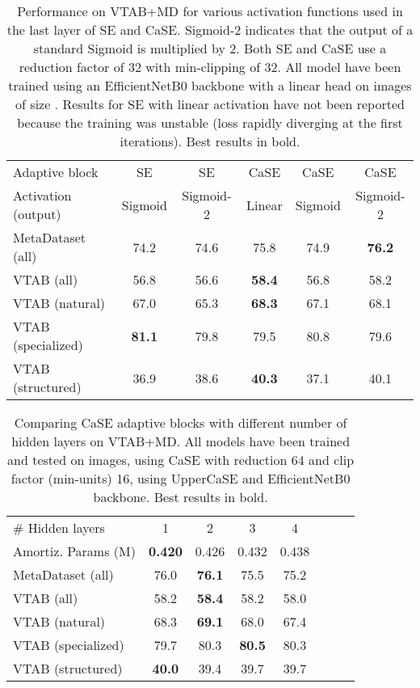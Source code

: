 \documentclass{article}
\begin{document}
\begin{table}[H]
\caption{Performance on VTAB+MD for various activation functions used in the last layer of SE and CaSE. Sigmoid-2 indicates that the output of a standard Sigmoid is multiplied by 2. Both SE and CaSE use a reduction factor of 32 with min-clipping of 32. All model have been trained using an EfficientNetB0 backbone with a linear head on images of size . Results for SE with linear activation have not been reported because the training was unstable (loss rapidly diverging at the first iterations). Best results in bold.}
\vskip 0.15in
\begin{center}
\begin{tabular}{lccccc}
\toprule
Adaptive block & SE & SE & CaSE & CaSE & CaSE \\
Activation (output) & Sigmoid & Sigmoid-2 & Linear & Sigmoid & Sigmoid-2 \\
\midrule
MetaDataset (all) & 74.2 & 74.6 & 75.8 & 74.9 & \textbf{76.2}\\
VTAB (all) & 56.8 & 56.6 & \textbf{58.4} & 56.8 & 58.2\\
VTAB (natural) & 67.0 & 65.3 & \textbf{68.3} & 67.1 & 68.1\\
VTAB (specialized) & \textbf{81.1} & 79.8 & 79.5 & 80.8 & 79.6\\
VTAB (structured) & 36.9 & 38.6 & \textbf{40.3} & 37.1 & 40.1\\
\bottomrule
\end{tabular}
\label{tab:ablation_activation_functions}
\end{center}
\vskip -0.1in
\end{table}

\begin{table}[H]
\caption{Comparing CaSE adaptive blocks with different number of hidden layers on VTAB+MD. All models have been trained and tested on  images, using CaSE with reduction 64 and clip factor (min-units) 16, using UpperCaSE and EfficientNetB0 backbone. Best results in bold.}
\vskip 0.15in
\begin{center}
\begin{tabular}{lccccccc}
\toprule
\# Hidden layers & 1 & 2 & 3 & 4\\
Amortiz. Params (M) & \textbf{0.420} & 0.426 & 0.432 & 0.438\\
\midrule
MetaDataset (all) & 76.0 & \textbf{76.1} & 75.5  & 75.2\\
VTAB (all) & 58.2 & \textbf{58.4} & 58.2 & 58.0\\
VTAB (natural) & 68.3 & \textbf{69.1} & 68.0  & 67.4\\
VTAB (specialized) & 79.7 & 80.3 & \textbf{80.5}  & 80.3 \\
VTAB (structured) & \textbf{40.0} & 39.4 & 39.7  & 39.7\\
\bottomrule
\end{tabular}
\label{tab:ablation_hidden_layers}
\end{center}
\vskip -0.1in
\end{table}
\end{document}
